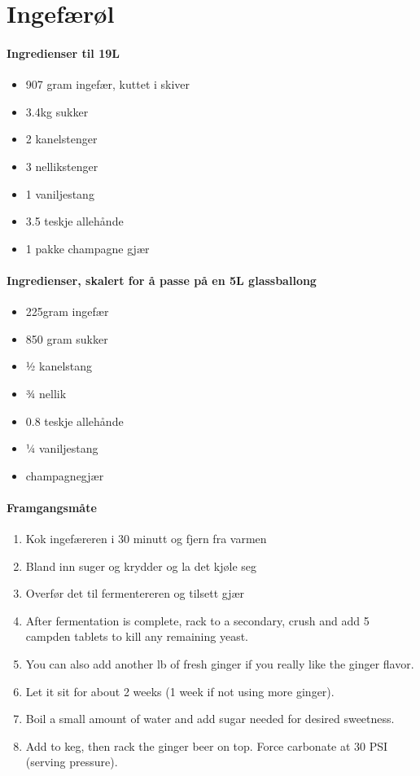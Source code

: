 \section{﻿Ingefærøl}


\paragraph{Ingredienser til 19L}
\begin{itemize}[noitemsep]
	\item 907 gram ingefær, kuttet i skiver
	\item 3.4kg sukker
	\item 2 kanelstenger
	\item 3 nellikstenger
	\item 1 vaniljestang
	\item 3.5 teskje allehånde
	\item 1 pakke champagne gjær
\end{itemize}

\paragraph{Ingredienser, skalert for å passe på en 5L glassballong}
\begin{itemize}[noitemsep]
	\item 225gram ingefær
	\item 850 gram sukker
	\item ½ kanelstang
	\item ¾ nellik
	\item 0.8 teskje allehånde
	\item ¼ vaniljestang
	\item champagnegjær
\end{itemize}

\paragraph{Framgangsmåte}
\begin{enumerate}[noitemsep]
	\item Kok ingefæreren i 30 minutt og fjern fra varmen
	\item Bland inn suger og krydder og la det kjøle seg
	\item Overfør det til fermentereren og tilsett gjær

	\item After fermentation is complete, rack to a secondary, crush and add 5 campden tablets to kill any remaining yeast.
	\item You can also add another lb of fresh ginger if you really like the ginger flavor.
	\item Let it sit for about 2 weeks (1 week if not using more ginger).
	\item Boil a small amount of water and add sugar needed for desired sweetness.
	\item Add to keg, then rack the ginger beer on top. Force carbonate at 30 PSI (serving pressure).
\end{enumerate}




